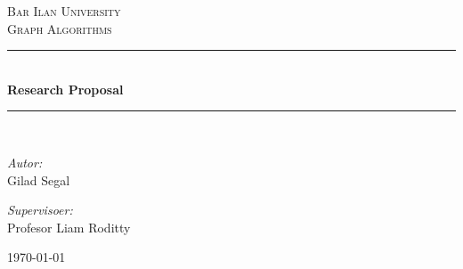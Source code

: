 \begin{titlepage}

  \newcommand{\HRule}{\rule{\linewidth}{0.5mm}} %

  \center %



  \textsc{\Large Bar Ilan University}\\[0.8cm] %
  \textsc{\large Graph Algorithms}\\[0.5cm] 

  
  

  \vspace{1.5 cm}
  \HRule \\[0.4cm]
  { \huge \bfseries Research Proposal}\\[0.4cm] %
  \HRule \\[1.5cm]
 

\begin{minipage}{0.46\textwidth}
\begin{flushleft} \large														\emph{Autor:}\\	
Gilad Segal\\
\end{flushleft}								
\end{minipage}		
\begin{minipage}{0.52\textwidth}		
\vspace{-0.6cm}								
\begin{flushright} \large					
\emph{Supervisoer:} \\						
Profesor Liam Roditty\\
\end{flushright}					
\end{minipage}	


  \vspace{10 cm}
  {\large \today}\\[3cm] %


\vfill %

\end{titlepage}


\newpage